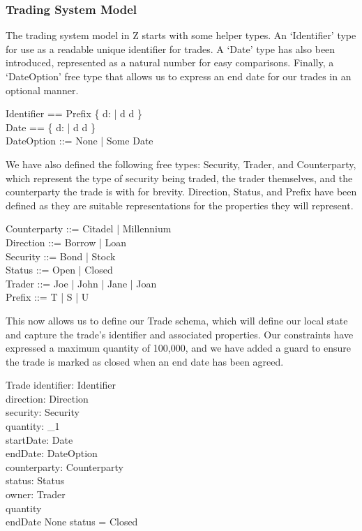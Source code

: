 \documentclass{article}
\begin{document}
\subsubsection*{Trading System Model}

The trading system model in Z starts with some helper types. An ‘Identifier’ type for use as a readable unique identifier for trades. A ‘Date’ type has also been introduced, represented as a natural number for easy comparisons. Finally, a ‘DateOption’ free type that allows us to express an end date for our trades in an optional manner. 

\begin{zed}
Identifier == Prefix \cross \{ d: \nat | d  \land d  \} \\ 
Date == \{ d: \nat | d  \land d  \} \\
DateOption ::= None | Some \ldata Date \rdata \\
\end{zed}

\hspace{-0.7cm} We have also defined the following free types: Security, Trader, and Counterparty, which represent the type of security being traded, the trader themselves, and the counterparty the trade is with for brevity. Direction, Status, and Prefix have been defined as they are suitable representations for the properties they will represent.

\begin{zed}
Counterparty ::= Citadel | Millennium  \\ 
Direction ::= Borrow | Loan \\
Security ::= Bond | Stock \\
Status ::= Open | Closed \\  
Trader ::= Joe | John | Jane | Joan \\
Prefix ::= T | S | U \\
\end{zed}

\hspace{-0.7cm} This now allows us to define our Trade schema, which will define our local state and capture the trade's identifier and associated properties. Our constraints have expressed a maximum quantity of 100,000, and we have added a guard to ensure the trade is marked as closed when an end date has been agreed.

\begin{schema}{Trade}
identifier: Identifier \\
direction: Direction \\ 
security: Security \\
quantity: \nat_1 \\
startDate: Date \\
endDate: DateOption \\ 
counterparty: Counterparty \\
status: Status \\
owner: Trader \\
\where
quantity  \\
endDate \neq None \implies status = Closed \\
\end{schema}
  
\end{document}
